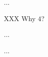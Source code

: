 \documentclass{article}
\theoremstyle{definition}
\begin{document}
\begin{description}[font=\normalfont\itshape\space]
\item[\textsc{RF-Send}] ...

\item[\textsc{RF-Req4}] XXX Why $4$?

\item[\textsc{RF-Req5}] ...

\item[\textsc{R-ReqF}] ...
\end{description}
\end{document}
